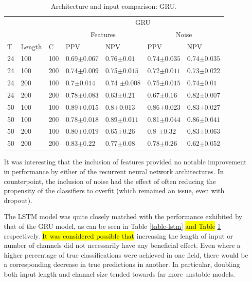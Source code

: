 \begin{table}
  \setlength{\tabcolsep}{8pt}
\centering
\caption{Architecture and input comparison: GRU.}
\label{table-gru}
\begin{tabular}{|lll|ll|ll|} 
\hline
   &        &     & \multicolumn{4}{c|}{GRU}                                                    \\ 
\cline{4-7}
   &        &     & \multicolumn{2}{c|}{Features}        & \multicolumn{2}{c|}{Noise}           \\
T  & Length & C   & PPV              & NPV               & PPV              & NPV               \\ 
\hline
24 & 100    & 100 & 0.69$\pm 0.067$  & 0.76$\pm 0.01$    & 0.74$\pm 0.035$  & 0.74$\pm 0.035$   \\
24 & 100    & 200 & 0.74$\pm 0.009$  & 0.75$\pm 0.015$   & 0.72$\pm 0.011$  & 0.73$\pm 0.022$   \\
24 & 200    & 100 & 0.7$\pm 0.014$   & 0.74 $\pm 0.008$  & 0.75$\pm 0.015$  & 0.74$\pm 0.01$    \\
24 & 200    & 200 & 0.78$\pm 0.083$  & 0.63$\pm 0.21$    & 0.67$\pm 0.16$   & 0.82$\pm 0.007$   \\
50 & 100    & 100 & 0.89$\pm 0.015$  & 0.8$\pm 0.013$    & 0.86$\pm 0.023$  & 0.83$\pm 0.027$   \\
50 & 100    & 200 & 0.78$\pm 0.018$  & 0.89$\pm 0.011$   & 0.81$\pm 0.044$  & 0.86$\pm 0.041$   \\
50 & 200    & 100 & 0.80$\pm 0.019$  & 0.65$\pm 0.26$    & 0.8 $\pm 0.32$   & 0.83$\pm 0.063$   \\
50 & 200    & 200 & 0.83$\pm 0.22$   & 0.77$\pm 0.08$    & 0.78$\pm 0.26$   & 0.62$\pm 0.052$   \\
\hline
\end{tabular}
\end{table}



It was interesting that the inclusion of features provided no notable improvement in performance by either of the recurrent neural network architectures. In counterpoint, the inclusion of noise had the effect of often reducing the propensity of the classifiers to overfit (which remained an issue, even with dropout). 

The LSTM model was quite closely matched with the performance exhibited by that of the GRU model, as can be seen in Table \ref{table-lstm} \hl{and Table} \ref{table-gru} respectively. \hl{It was considered possible that } increasing the length of input or number of channels did not necessarily have any beneficial effect. Even where a higher percentage of true classifications were achieved in one field, there would be a corresponding decrease in true predictions in another. In particular, doubling both input length and channel size tended towards far more unstable models. 




